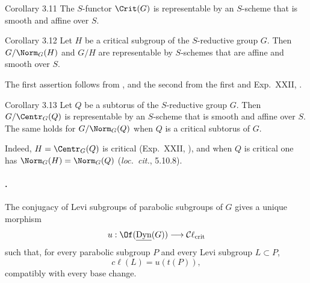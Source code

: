 \begin{sgastatement}{Corollary 3.11}
The \(S\)-functor \(\Crit(G)\) is representable by an \(S\)-scheme that
is smooth and affine over \(S\).
\end{sgastatement}

\begin{sgastatement}{Corollary 3.12}
Let \(H\) be a critical subgroup of the \(S\)-reductive group \(G\).
Then \(G/\Norm_G(H)\) and \(G/H\) are representable by \(S\)-schemes that
are affine and smooth over \(S\).
\end{sgastatement}

The first assertion follows from , and the second from the first and
Exp.\ XXII, .

\begin{sgastatement}{Corollary 3.13}
Let \(Q\) be a subtorus of the \(S\)-reductive group \(G\).  Then
\(G/\Centr_G(Q)\) is representable by an \(S\)-scheme that is smooth and
affine over \(S\).  The same holds for \(G/\Norm_G(Q)\) when \(Q\) is a
critical subtorus of \(G\).
\end{sgastatement}

Indeed, \(H=\Centr_G(Q)\) is critical (Exp.\ XXII, ), and when
\(Q\) is critical one has
\(\Norm_G(H)=\Norm_G(Q)\) (\emph{loc.\ cit.}, 5.10.8).

\paragraph{.}
The conjugacy of Levi subgroups of parabolic subgroups of \(G\) gives a
unique morphism
\[
 u:\Of(\underline{\operatorname{Dyn}}(G))
 \longrightarrow\mathcal C\ell_{\mathrm{crit}}
\]
such that, for every parabolic subgroup \(P\) and every Levi subgroup
\(L\subset P\),
\[
 c\ell(L)=u(t(P)),
\]
compatibly with every base change.

